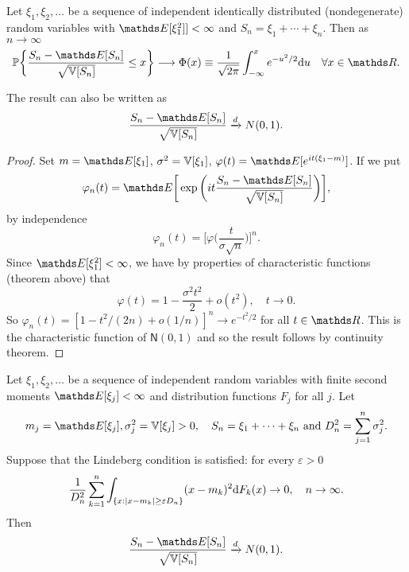 \begin{theorem}
Let $\xi_1, \xi_2, \dots $ be a sequence of independent identically distributed (nondegenerate) random variables with $\E[\xi_1^2]] < \infty$ and $S_n = \xi_1 + \cdots + \xi_n$. Then as $n \to \infty$
\begin{equation*}
    \p \bigg\{ \frac{S_n - \E[S_n]}{\sqrt{\V[S_n]}} \le x \bigg\} \longrightarrow \Phi(x) \equiv \frac{1}{\sqrt{2\pi}} \int_{-\infty}^x e^{-u^2/2} \d u \quad \forall x \in \R.
\end{equation*}
\end{theorem}
\begin{remark}
The result can also be written as 
\begin{equation*}
    \frac{S_n - \E[S_n]}{\sqrt{\V[S_n]}} \xrightarrow{d} N(0,1).
\end{equation*}
\end{remark}
\begin{proof}
Set $m = \E[\xi_1]$, $\sigma^2 = \mathbb{V}[\xi_1]$, $\varphi(t) = \E[e^{it(\xi_1 - m)}]$.
If we put
\begin{equation*}
    \varphi_n(t) = \E\bigg[\exp \bigg(it \frac{S_n - \E[S_n]}{\sqrt{\V[S_n]}} \bigg)\bigg],
\end{equation*}
by independence 
\begin{equation*}
    \varphi_n(t) = \bigg[\varphi\bigg(\frac{t}{\sigma \sqrt{n}}\bigg)\bigg]^n.
\end{equation*}
Since $\E[\xi_1^2] < \infty$, we have by properties of characteristic functions (theorem above) that 
\begin{equation*}
    \varphi(t) = 1 - \frac{\sigma^2 t^2}{2} + o(t^2), \quad t \to 0.
\end{equation*}
So $\varphi_n(t) = [1 - t^2/(2n) + o(1/n)]^n \to e^{-t^2/2}$ for all $t \in \R$. This is the characteristic function of $\mathsf{N}(0,1)$ and so the result follows by continuity theorem.
\end{proof}
\begin{theorem}
Let $\xi_1, \xi_2, \dots$ be a sequence of independent random variables with finite second moments $\E[\xi_j] < \infty$ and distribution functions $F_j$ for all $j$. Let $$m_j = \E[\xi_j], \sigma_j^2 = \V[\xi_j] >0,\quad S_n = \xi_1 + \cdots + \xi_n \text{ and } D_n^2 = \sum_{j=1}^n \sigma_j^2.$$ 
Suppose that the Lindeberg condition is satisfied: for every $\varepsilon > 0$
\begin{equation*}
    \frac{1}{D_n^2}\sum_{k=1}^n \int_{\{x:|x-m_k|\ge \varepsilon D_n \}} (x-m_k)^2 \mathrm{d} F_k(x) \to 0, \quad n \to \infty.
\end{equation*}
Then 
\begin{equation*}
    \frac{S_n - \E[S_n]}{\sqrt{\V[S_n]}} \xrightarrow{d} N(0,1).
\end{equation*}
\end{theorem}
